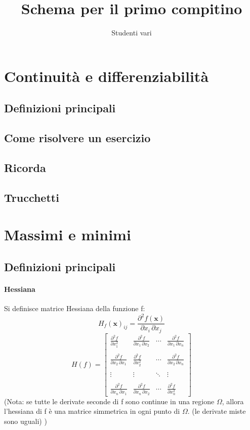 \documentclass[a4paper,10pt]{book}
\author{Studenti vari}
\title{Schema per il primo compitino}
\begin{document}
\maketitle

\section{Continuità e differenziabilità}
\subsection{Definizioni principali}

\subsection{Come risolvere un esercizio}

\subsection{Ricorda}

\subsection{Trucchetti}

\section{Massimi e minimi}
\subsection{Definizioni principali}

\paragraph{Hessiana}
Si definisce matrice Hessiana della funzione f:
$$  H_{f}(\mathbf{x})_{ij} = \frac{\partial^2 f(\mathbf{x})}{\partial x_i\, \partial x_j} $$
$$ H(f) = \begin{bmatrix} \frac{\partial^2 f}{\partial x_1^2} & \frac{\partial^2 f}{\partial x_1\,\partial x_2} & \cdots & \frac{\partial^2 f}{\partial x_1\,\partial x_n} \\ \\ \frac{\partial^2 f}{\partial x_2\,\partial x_1} & \frac{\partial^2 f}{\partial x_2^2} & \cdots & \frac{\partial^2 f}{\partial x_2\,\partial x_n} \\ \\ \vdots & \vdots & \ddots & \vdots \\ \\ \frac{\partial^2 f}{\partial x_n\,\partial x_1} & \frac{\partial^2 f}{\partial x_n\,\partial x_2} & \cdots & \frac{\partial^2 f}{\partial x_n^2} \end{bmatrix}$$
(Nota: se tutte le derivate seconde di f sono continue in una regione $\Omega$, allora l'hessiana di f è una matrice simmetrica in ogni punto di $\Omega$. (le derivate miste sono uguali) )
\end{document}
